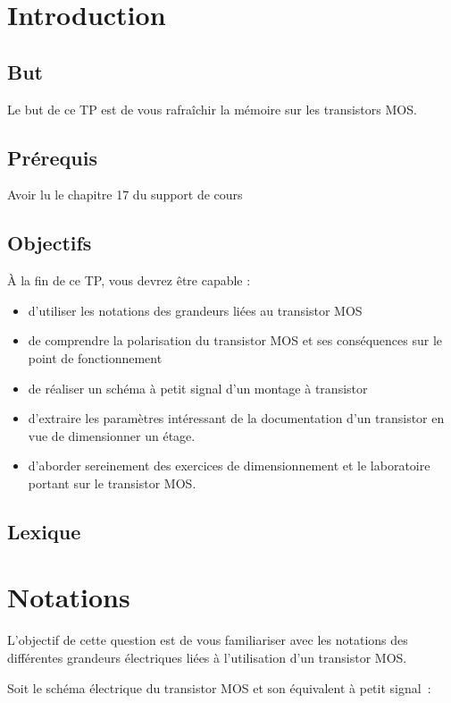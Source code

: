 \documentclass{../template/tp}
\author{The Fantastic Four}
\begin{document}

\section{Introduction}
\subsection{But}
Le but de ce TP est de vous rafraîchir la mémoire sur les transistors MOS.
\subsection{Prérequis}
Avoir lu le chapitre 17 du support de cours
\subsection{Objectifs}
À la fin de ce TP, vous devrez être capable :
\begin{itemize}
\item d'utiliser les notations des grandeurs liées au transistor MOS
\item de comprendre la polarisation du transistor MOS et ses conséquences sur le point de fonctionnement
\item de réaliser un schéma à petit signal d'un montage à transistor
\item d'extraire les paramètres intéressant de la documentation d'un transistor en vue de dimensionner un étage.
\item d'aborder sereinement des exercices de dimensionnement et le laboratoire portant sur le transistor MOS.
\end{itemize}
\subsection{Lexique}
\newpage
\section{Notations}
L’objectif de cette question est de vous familiariser avec les notations des différentes grandeurs électriques liées à l'utilisation d'un transistor MOS.

Soit le schéma électrique du transistor MOS et son équivalent à petit signal~:
\end{document}
